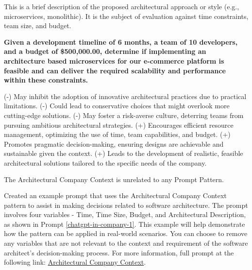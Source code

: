 \MyParaBold{\textcolor{mycolororange}{[Architecture Description]:}}This is a brief description of the proposed architectural approach or style (e.g., microservices, monolithic). It is the subject of evaluation against time constraints, team size, and budget.
       
\textbf{\textcolor{mycolorgreen}{Given a development timeline of 6 months, }\textcolor{mycolorblue}{a team of 10 developers, }\textcolor{mycolorpink}{and a budget of \$500,000.00, }\textcolor{mycolororange}{determine if implementing an architecture based microservices for our e-commerce platform is feasible and can deliver the required scalability and performance within these constraints.}
}

\newline
\textcolor{mycolorred}{(-)} May inhibit the adoption of innovative architectural practices due to practical limitations.\newline
\textcolor{mycolorred}{(-)} Could lead to conservative choices that might overlook more cutting-edge solutions.\newline
\textcolor{mycolorred}{(-)} May foster a risk-averse culture, deterring teams from pursuing ambitious architectural strategies.\newline
\textcolor{mycolorblue}{(+)} Encourages efficient resource management, optimizing the use of time, team capabilities, and budget.\newline
\textcolor{mycolorblue}{(+)} Promotes pragmatic decision-making, ensuring designs are achievable and sustainable given the context.\newline
\textcolor{mycolorblue}{(+)} Leads to the development of realistic, feasible architectural solutions tailored to the specific needs of the company.

 The Architectural Company Context is unrelated to any Prompt Pattern.

 Created an example prompt that uses the Architectural Company Context pattern to assist in making decisions related to software architecture. The prompt involves four variables - Time, Time Size, Budget, and Architectural Description, as shown in Prompt \ref{chatgpt-in-company-1}. This example will help demonstrate how the pattern can be applied in real-world scenarios. You can choose to remove any variables that are not relevant to the context and requirement of the software architect's decision-making process. For more information, full prompt at the following link: \href{https://chat.openai.com/share/5b124d5f-cc5e-422c-ab11-b932d482de1d}{Architectural Company Context}.

